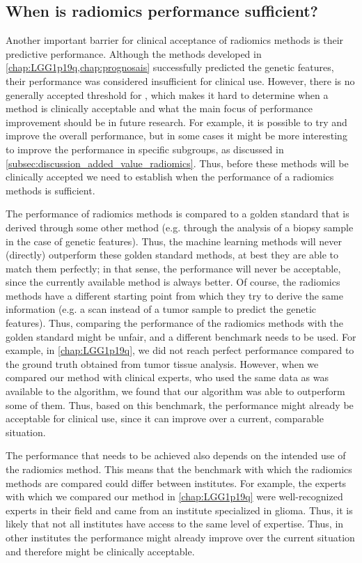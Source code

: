 \subsection{When is radiomics performance sufficient?}\label{subsec:discussion_radiomics_performance}

Another important barrier for clinical acceptance of radiomics methods is their predictive performance.
Although the methods developed in \cref{chap:LGG1p19q,chap:prognosais} successfully predicted the genetic features, their performance was considered insufficient for clinical use.
However, there is no generally accepted threshold for , which makes it hard to determine when a method is clinically acceptable and what the main focus of performance improvement should be in future research.
For example, it is possible to try and improve the overall performance, but in some cases it might be more interesting to improve the performance in specific subgroups, as discussed in \cref{subsec:discussion_added_value_radiomics}.
Thus, before these methods will be clinically accepted we need to establish when the performance of a radiomics methods is sufficient.

The performance of radiomics methods is compared to a golden standard that is derived through some other method (e.g. through the analysis of a biopsy sample in the case of genetic features).
Thus, the machine learning methods will never (directly) outperform these golden standard methods, at best they are able to match them perfectly; in that sense, the performance will never be acceptable, since the currently available method is always better.
Of course, the radiomics methods have a different starting point from which they try to derive the same information (e.g. a scan instead of a \gls{tumor} sample to predict the genetic features).
Thus, comparing the performance of the radiomics methods with the golden standard might be unfair, and a different benchmark needs to be used.
For example, in \cref{chap:LGG1p19q}, we did not reach perfect performance compared to the ground truth obtained from \gls{tumor} tissue analysis.
However, when we compared our method with clinical experts, who used the same data as was available to the algorithm, we found that our algorithm was able to outperform some of them.
Thus, based on this benchmark, the performance might already be acceptable for clinical use, since it can improve over a current, comparable situation.

The performance that needs to be achieved also depends on the intended use of the radiomics method.
This means that the benchmark with which the radiomics methods are compared could differ between institutes.
For example, the experts with which we compared our method in \cref{chap:LGG1p19q} were well-recognized experts in their field and came from an institute specialized  in glioma.
Thus, it is likely that not all institutes have access to the same level of expertise.
Thus, in other institutes the performance might already improve over the current situation and therefore might be clinically acceptable.

